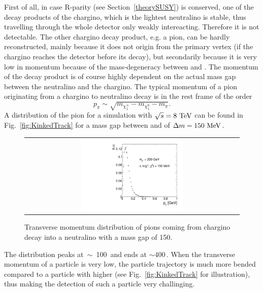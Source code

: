 First of all, in case R-parity (see Section~\ref{theorySUSY}) is conserved, one of the decay products of the chargino, which is the lightest neutralino \chiO is stable, thus travelling through the whole detector only weakly intereacting.
Therefore it is not detectable. 
The other chargino decay product, e.g. a pion, can be hardly reconstructed, mainly because it does not origin from the primary vertex (if the chargino reaches the detector before its decay), 
but secondarily because it is very low in momentum because of the mass-degeneracy between \chipm and \chiO.
The momentum of the decay product is of course highly dependent on the actual mass gap between the neutralino and the chargino.
The typical momentum of a pion originating from a chargino to neutralino decay is in the \chipm rest frame of the order 
\begin{equation*}
p_{\pi}\sim \sqrt{m_{\chi^{\pm}_1}-m_{\chi^{0}_1}-m_{\pi}}.
\end{equation*}
A \pt distribution of the pion for a simulation with $\sqrt{s} = 8\,\,\text{Te}\kern-0.06667em\text{V}$ can be found in Fig.~\ref{fig:KinkedTrack} for a mass gap between \chipm and \chiO of $\Delta m=150\, \,\text{Me}\kern-0.06667em\text{V}$.
\begin{figure}[!b]
  \centering 
  \begin{tabular}{c}
    \includegraphics[width=0.49\textwidth]{figures/analysis/PtOfPions.pdf}
  \end{tabular}
  \caption{Transverse momentum distribution of pions coming from chargino decay into a neutralino with a mass gap of 150\mev.}
  \label{fig:ptOfPions}
\end{figure} 
The \pt distribution peaks \mbox{at $\sim$ 100\,\mev} and ends at \mbox{\pt $\sim 400\,$\mev}.
When the transverse momentum of a particle is very low, the particle trajectory is much more bended compared to a particle with higher \pt (see Fig.~\ref{fig:KinkedTrack} for illustration), 
thus making the detection of such a particle very challinging.
